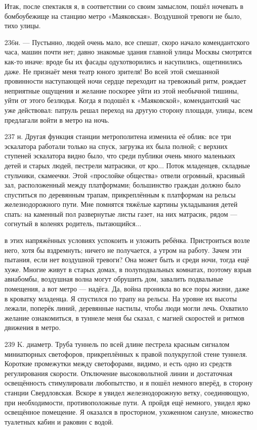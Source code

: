 Итак, после спектакля я, в соответствии со своим замыслом, пошёл ночевать в бомбоубежище на станцию метро «Маяковская». Воздушной тревоги не было, тихо улицы.

236н. — Пустынно, людей очень мало, все спешат, скоро начало комендантского часа, машин почти нет; давно знакомые здания главной улицы Москвы смотрятся как-то иначе: вроде бы их фасады одухотворились и насупились, ощетинились даже. Не признаёт меня театр юного зрителя! Во всей этой смешанной провинности наступающей ночи сердце переходит на тревожный ритм, рождает неприятные ощущения и желание поскорее уйти из этой необычной тишины, уйти от этого безлюдья. Когда я подошёл к «Маяковской», комендантский час уже действовал: патруль решал переход на другую сторону площади, улицы, всем предлагали войти в метро на ночь.

237 н.
Другая функция станции метрополитена изменила её облик: все три эскалатора работали только на спуск, загрузка их была полной; с верхних ступеней эскалатора видно было, что среди публики очень много маленьких детей и старых людей, пестрели матрасики, от кро...
Поток младенцев, складные стульчики, скамеечки. Этой «прослойке общества» отвели огромный, красивый зал, расположенный между платформами; большинство граждан должно было спуститься по деревянным трапам, прикреплённым к платформам на рельсы железнодорожного пути. Мне помнятся тяжёлые картины укладывания детей спать: на каменный пол развернутые листы газет, на них матрасик, рядом — согнутый в коленях родитель, пытающийся...

в этих напряжённых условиях успокоить и уложить ребёнка. Пристроиться возле него, хотя бы вздремнуть; ничего не получается, а утром на работу. Зачем эти пытания, если нет воздушной тревоги? Она может быть и среди ночи, тогда ещё хуже. Многие живут в старых домах, в полуподвальных комнатах, поэтому взрыв авиабомбы, воздушная волна могут обрушить дом, завалить подвальные помещения, а вот метро — надёга. Да, война проникла во все поры жизни, даже в кроватку младенца. Я спустился по трапу на рельсы. На уровне их высоты лежали, поперёк линий, деревянные настилы, чтобы люди могли лечь. Охватило желание ознакомиться, в туннеле меня бы сказал, с магией скоростей и ритмов движения в метро.

239 K. диаметр. Труба туннель по всей длине пестрела красным сигналом миниатюрных светофоров, прикреплённых к правой полукруглой стене туннеля. Короткие промежутки между светофорами, видимо, и есть одно из средств регулирования скорости. Отключение высоковольтной линии и достаточная освещённость стимулировали любопытство, и я пошёл немного вперёд, в сторону станции Свердловская. Вскоре я увидел железнодорожную ветку, соединяющую, при необходимости, противоположные пути. А пройдя ещё немного, увидел ярко освещённое помещение. Я оказался в просторном, ухоженном санузле, множество туалетных кабин и раковин с водой.

